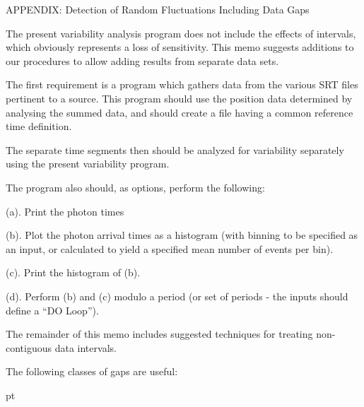 \@{APPENDIX:  Detection of Random Fluctuations Including Data Gaps}

The present variability analysis program does not include the effects of
intervals, which obviously represents a loss of sensitivity.  This memo
suggests additions to our procedures to allow adding results from separate
data sets.

The first requirement is a program which gathers data from the
various SRT files pertinent to a source.  This program should 
use the position data determined by analysing the summed data,
and should create a file having a common reference time
definition.

The separate time segments then should be analyzed for
variability separately using the present variability program.

The program also should, as options, perform the following:

\item{(a).}  Print the photon times
\item{(b).}  Plot the photon arrival times as a histogram (with 
binning to be specified as an input, or calculated to
yield a specified mean number of events per bin).
\item{(c).}  Print the histogram of (b).
\item{(d).}  Perform (b) and (c) modulo a period (or set of periods -
the inputs should define a ``DO Loop'').

The remainder of this memo includes suggested techniques for treating 
non-contiguous data intervals.



{\list

The following classes of gaps are useful:

 }

\vskip 12pt


 pt


